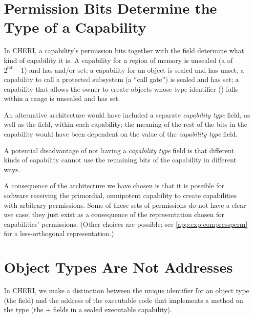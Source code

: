 \section{Permission Bits Determine the Type of a Capability}

In CHERI, a capability's permission bits together with the \cotype{} field
determine what kind of capability it is. A capability for a region of memory
is unsealed (a \cotype{} of $2^{64}-1$) and has \emph{\cappermL{}} and/or \emph{\cappermS{}} set;
a capability for an object is sealed and has \emph{\cappermX{}}
unset; a capability to call a protected subsystem (a ``call gate'') is
sealed and has \emph{\cappermX{}} set; a capability that allows
the owner to create objects whose type identifier (\cotype{}) falls within
a range is unsealed and has \emph{\cappermSeal{}} set.

An alternative architecture would have included a separate
\emph{capability type} field, as well as the \cperms{} field, within each
capability; the meaning of the rest of the bits in the capability would have
been dependent on the value of the \emph{capability type} field.

A potential disadvantage of not having a \emph{capability type} field is that
different kinds of capability cannot use the remaining bits of the capability
in different ways.

A consequence of the architecture we have chosen is that it is possible for
software receiving the primordial, omnipotent capability to create capabilities
with arbitrary permissions.  Some of these sets of permissions do not have a
clear use case; they just exist as a consequence of the representation chosen
for capabilities' permissions.  (Other choices are possible; see
\cref{app:exp:compressperm} for a less-orthogonal representation.)


\section{Object Types Are Not Addresses}

In CHERI, we make a distinction between the unique identifier for an
object type (the \cotype{} field) and the address of the executable code
that implements a method on the type (the \cbase{} $+$ \coffset{} fields
in a sealed executable capability).

